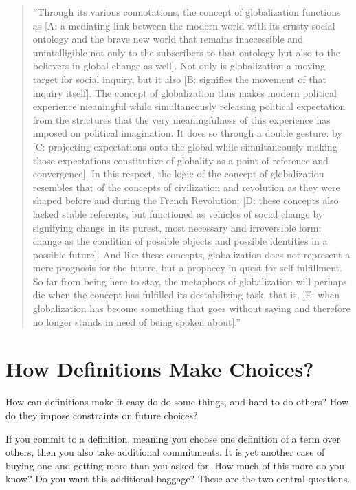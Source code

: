 \documentclass[graybox,envcountchap,sectrefs]{svmono}
\begin{document}
\begin{quote}
''Through its various connotations, the concept of globalization functions as [A: a mediating link between the modern world with its crusty social ontology and the brave new world that remains inaccessible and unintelligible not only to the subscribers to that ontology but also to the believers in global change as well]. Not only is globalization a moving target for social inquiry, but it also [B: signifies the movement of that inquiry itself]. The concept of globalization thus makes modern political experience meaningful while simultaneously releasing political expectation from the strictures that the very meaningfulness of this experience has imposed on political imagination. It does so through a double gesture: by [C: projecting expectations onto the global while simultaneously making those expectations constitutive of globality as a point of reference and convergence]. In this respect, the logic of the concept of globalization resembles that of the concepts of civilization and revolution as they were shaped before and during the French Revolution: [D: these concepts also lacked stable referents, but functioned as vehicles of social change by signifying change in its purest, most necessary and irreversible form: change as the condition of possible objects and possible identities in a possible future]. And like these concepts, globalization does not represent a mere prognosis for the future, but a prophecy in quest for self-fulfillment. So far from being here to stay, the metaphors of globalization will perhaps die when the concept has fulfilled its destabilizing task, that is, [E: when globalization has become something that goes without saying and therefore no longer stands in need of being spoken about].'' \cite{bartelson2000three}
\end{quote}


\section{How Definitions Make Choices?}
\label{c6:s4}
How can definitions make it easy do do some things, and hard to do others? How do they impose constraints on future choices?

If you commit to a definition, meaning you choose one definition of a term over others, then you also take additional commitments. It is yet another case of buying one and getting more than you asked for. How much of this more do you know? Do you want this additional baggage? These are the two central questions.
\end{document}
